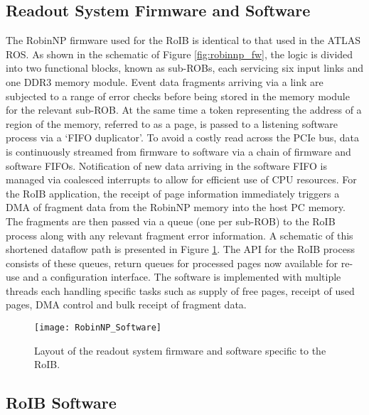 \subsection{Readout System Firmware and Software}\label{sec:crorc_fw}

The RobinNP firmware used for the RoIB is identical to that used in the ATLAS ROS\cite{ros}. As shown in 
the schematic of Figure \ref{fig:robinnp_fw}, the logic is divided into two functional blocks, known as sub-ROBs, 
each servicing six input links and one DDR3 memory module. Event data fragments arriving via a link are subjected 
to a range of error checks before being stored in the memory module for the relevant sub-ROB. At the same time a token
representing the address of a region of the memory, referred to as a page, is passed to a listening software process via 
a `FIFO duplicator'. To avoid a costly read across the PCIe bus, data is continuously streamed from firmware to 
software via a chain of firmware and software FIFOs. Notification of new data arriving in the software FIFO is managed via coalesced 
interrupts to allow for efficient use of CPU resources.
For the RoIB application, the receipt of page information immediately triggers a DMA of fragment data from the RobinNP memory into 
the host PC memory. The fragments are then passed via a queue (one per sub-ROB) to the RoIB process along with any relevant fragment 
error information. A schematic of this shortened dataflow path is presented in Figure \ref{fig:roib_swfw}. 
The API for the RoIB process consists of these queues, return queues for processed pages now available for re-use and 
a configuration interface. The software is implemented with multiple threads each handling specific tasks such as supply of free pages, receipt
of used pages, DMA control and bulk receipt of fragment data.


\begin{figure}[tbp] %
\centering
\texttt{[image: RobinNP\_Software]}
\caption{Layout of the readout system firmware and software specific to the RoIB.}
\label{fig:roib_swfw}
\end{figure}

\subsection{RoIB Software}\label{sec:crorc_sw}

